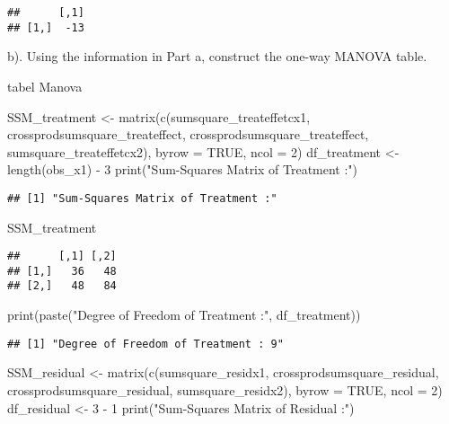 \documentclass[
]{article}
\newenvironment{Shaded}{\begin{snugshade}}{\end{snugshade}}
\newcommand{\AttributeTok}[1]{\textcolor[rgb]{0.77,0.63,0.00}{#1}}
\newcommand{\ConstantTok}[1]{\textcolor[rgb]{0.00,0.00,0.00}{#1}}
\newcommand{\DecValTok}[1]{\textcolor[rgb]{0.00,0.00,0.81}{#1}}
\newcommand{\FunctionTok}[1]{\textcolor[rgb]{0.00,0.00,0.00}{#1}}
\newcommand{\NormalTok}[1]{#1}
\newcommand{\OtherTok}[1]{\textcolor[rgb]{0.56,0.35,0.01}{#1}}
\newcommand{\SpecialCharTok}[1]{\textcolor[rgb]{0.00,0.00,0.00}{#1}}
\newcommand{\StringTok}[1]{\textcolor[rgb]{0.31,0.60,0.02}{#1}}
\begin{document}
\begin{verbatim}
##      [,1]
## [1,]  -13
\end{verbatim}

b). Using the information in Part a, construct the one-way MANOVA table.

tabel Manova

\begin{Shaded}
\begin{Highlighting}[]
\NormalTok{SSM\_treatment }\OtherTok{\textless{}{-}} \FunctionTok{matrix}\NormalTok{(}\FunctionTok{c}\NormalTok{(sumsquare\_treateffetcx1, crossprodsumsquare\_treateffect, crossprodsumsquare\_treateffect, sumsquare\_treateffetcx2), }\AttributeTok{byrow =} \ConstantTok{TRUE}\NormalTok{, }\AttributeTok{ncol =} \DecValTok{2}\NormalTok{)}
\NormalTok{df\_treatment }\OtherTok{\textless{}{-}} \FunctionTok{length}\NormalTok{(obs\_x1) }\SpecialCharTok{{-}} \DecValTok{3} 
\FunctionTok{print}\NormalTok{(}\StringTok{"Sum{-}Squares Matrix of Treatment :"}\NormalTok{)}
\end{Highlighting}
\end{Shaded}

\begin{verbatim}
## [1] "Sum-Squares Matrix of Treatment :"
\end{verbatim}

\begin{Shaded}
\begin{Highlighting}[]
\NormalTok{SSM\_treatment}
\end{Highlighting}
\end{Shaded}

\begin{verbatim}
##      [,1] [,2]
## [1,]   36   48
## [2,]   48   84
\end{verbatim}

\begin{Shaded}
\begin{Highlighting}[]
\FunctionTok{print}\NormalTok{(}\FunctionTok{paste}\NormalTok{(}\StringTok{"Degree of Freedom of Treatment :"}\NormalTok{, df\_treatment))}
\end{Highlighting}
\end{Shaded}

\begin{verbatim}
## [1] "Degree of Freedom of Treatment : 9"
\end{verbatim}

\begin{Shaded}
\begin{Highlighting}[]
\NormalTok{SSM\_residual }\OtherTok{\textless{}{-}} \FunctionTok{matrix}\NormalTok{(}\FunctionTok{c}\NormalTok{(sumsquare\_residx1, crossprodsumsquare\_residual, crossprodsumsquare\_residual, sumsquare\_residx2), }\AttributeTok{byrow =} \ConstantTok{TRUE}\NormalTok{, }\AttributeTok{ncol =} \DecValTok{2}\NormalTok{)}
\NormalTok{df\_residual }\OtherTok{\textless{}{-}} \DecValTok{3} \SpecialCharTok{{-}} \DecValTok{1}
\FunctionTok{print}\NormalTok{(}\StringTok{"Sum{-}Squares Matrix of Residual :"}\NormalTok{)}
\end{Highlighting}
\end{Shaded}
\end{document}
